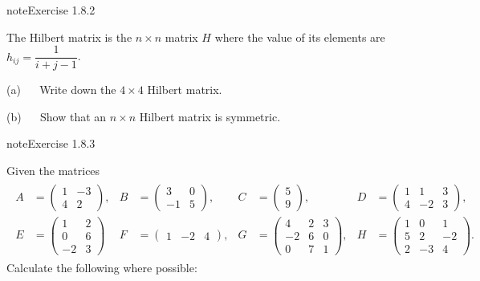 \documentclass[letterpaper,10pt,english]{jupyterBook}
\begin{document}
\begin{sphinxadmonition}{note}{Exercise 1.8.2}



\sphinxAtStartPar
The Hilbert matrix is the \(n \times n\) matrix \(H\) where the value of its elements are \(h_{ij} = \dfrac{1}{i + j - 1}\).

\sphinxAtStartPar
(a)   Write down the \(4 \times 4\) Hilbert matrix.

\sphinxAtStartPar
(b)   Show that an \(n \times n\) Hilbert matrix is symmetric.
\end{sphinxadmonition}
 \label{exercise:matrices-ex2}

\begin{sphinxadmonition}{note}{Exercise 1.8.3}



\sphinxAtStartPar
Given the matrices
\begin{equation*}
\begin{split} \begin{align*}
    A &= \begin{pmatrix} 1 & -3 \\ 4 & 2 \end{pmatrix}, &
    B &= \begin{pmatrix} 3 & 0 \\ -1 & 5 \end{pmatrix}, &
    C &= \begin{pmatrix} 5 \\ 9 \end{pmatrix}, &
    D &= \begin{pmatrix} 1 & 1 & 3 \\ 4 & -2 & 3 \end{pmatrix}, \\
    E &= \begin{pmatrix} 1 & 2 \\ 0 & 6 \\ -2 & 3 \end{pmatrix} &
    F &= \begin{pmatrix} 1 & -2 & 4 \end{pmatrix}, &
    G &= \begin{pmatrix} 4 & 2 & 3 \\ -2 & 6 & 0 \\ 0 & 7 & 1 \end{pmatrix}, &
    H &= \begin{pmatrix} 1 & 0 & 1 \\ 5 & 2 & -2 \\ 2 & -3 & 4 \end{pmatrix}.
\end{align*} \end{split}
\end{equation*}
\sphinxAtStartPar
Calculate the following where possible:


\end{sphinxadmonition}
\end{document}
